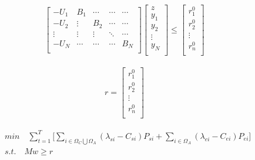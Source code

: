 \documentclass[11pt]{article} %
\begin{document}
\begin{align}  
    \begin{bmatrix}
        -U_{1} & B_{1} & \cdots & \cdots & \cdots\\
        -U_{2} &\vdots  & B_{2} & \cdots & \cdots\\
         \vdots  & \vdots  & \vdots & \ddots  & \cdots\\
        -U_{N} & \cdots  & \cdots & \cdots & B_{N}\\
    \end{bmatrix}
    \begin{bmatrix}
        z\\
        y_1\\
        y_2\\
        \vdots \\
        y_N\\
    \end{bmatrix} \leq
    \begin{bmatrix}
        r_{1}^0\\
        r_{2}^0\\
        \vdots \\
        r_{n}^0\\
    \end{bmatrix}
\end{align}


\begin{align}  
    r = \begin{bmatrix}
        r_{1}^0\\
        r_{2}^0\\
        \vdots \\
        r_{n}^0\\
    \end{bmatrix}
\end{align}




\begin{align}  
    &min \quad \sum_{t = 1}^{T} \Bigg[ \sum_{i \in \Omega_C\bigcup \Omega_A } (\lambda _{si} - C_{si}) P_{si} + 
    \sum_{i \in \Omega_A } (\lambda _{ei} - C_{ei}) P_{ei} \Bigg] \nonumber\\
    &s.t. \quad Mw \geq r
\end{align}
\end{document}
